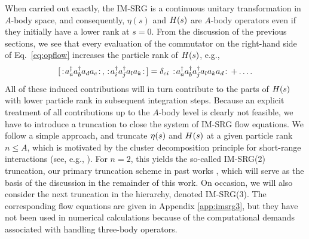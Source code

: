 When carried out exactly, the IM-SRG is a continuous unitary transformation in $A$-body space, and consequently, $\eta(s)$ and $H(s)$ are $A$-body operators even if they initially have a lower rank at $s=0$. From the discussion of the previous sections, we see that every evaluation of the commutator on the right-hand side of Eq.~\eqref{eq:opflow} increases the particle rank of $H(s)$, e.g.,
\begin{equation}\label{eq:induced}
  \comm{\nord{\aaO_{a}\aaO_{b}\aO_{d}\aO_{c}}}{\nord{\aaO_{i}\aaO_{j}\aO_{l}\aO_{k}}}= \delta_{ci}\nord{\aaO_{a}\aaO_{b}\aaO_{j}\aO_{l}\aO_{k}\aO_{d}}+\ldots.
\end{equation}
All of these induced contributions will in turn contribute to the parts of $H(s)$ with lower particle rank in subsequent integration steps. Because an explicit treatment of all contributions up to the $A$-body level is clearly not feasible, we have to introduce a truncation to close the system of IM-SRG flow equations. We follow a simple approach, and truncate $\eta(s)$ and $H(s)$ at a given particle rank $n\leq A$, which is motivated by the cluster decomposition principle for short-range interactions (see, e.g., \cite{Weinberg:1996uf}). For $n=2$, this yields the so-called IM-SRG(2) truncation, our primary truncation scheme in past works \cite{Tsukiyama:2011uq,Tsukiyama:2012fk,Hergert:2013mi}, which will serve as the basis of the discussion in the remainder of this work. On occasion, we will also consider the next truncation in the hierarchy, denoted IM-SRG(3). The corresponding flow equations are given in Appendix \ref{app:imsrg3}, but they have not been used in numerical calculations because of the computational demands associated with handling three-body operators.

